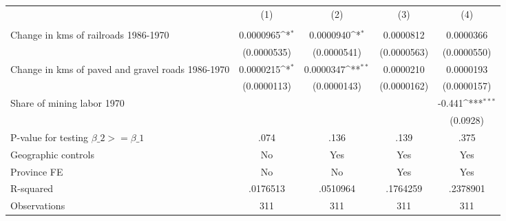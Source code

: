 {
\def\sym#1{\ifmmode^{#1}\else\(^{#1}\)\fi}
\begin{tabular}{l*{4}{c}}
\hline\hline
                &\multicolumn{1}{c}{(1)}&\multicolumn{1}{c}{(2)}&\multicolumn{1}{c}{(3)}&\multicolumn{1}{c}{(4)}\\
                &\multicolumn{1}{c}{}&\multicolumn{1}{c}{}&\multicolumn{1}{c}{}&\multicolumn{1}{c}{}\\
\hline
Change in kms of railroads 1986-1970&0.0000965\sym{*}  &0.0000940\sym{*}  &0.0000812         &0.0000366         \\
                &(0.0000535)         &(0.0000541)         &(0.0000563)         &(0.0000550)         \\
[1em]
Change in kms of paved and gravel roads 1986-1970&0.0000215\sym{*}  &0.0000347\sym{**} &0.0000210         &0.0000193         \\
                &(0.0000113)         &(0.0000143)         &(0.0000162)         &(0.0000157)         \\
[1em]
Share of mining labor 1970&                  &                  &                  &   -0.441\sym{***}\\
                &                  &                  &                  & (0.0928)         \\
\hline
P-value for testing $\beta\_{2} >= \beta\_{1}$&     .074         &     .136         &     .139         &     .375         \\
Geographic controls&       No         &      Yes         &      Yes         &      Yes         \\
Province FE     &       No         &       No         &      Yes         &      Yes         \\
R-squared       & .0176513         & .0510964         & .1764259         & .2378901         \\
Observations    &      311         &      311         &      311         &      311         \\
\hline\hline
\end{tabular}
}
